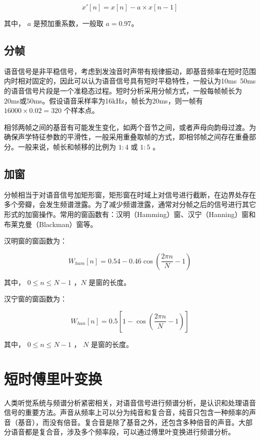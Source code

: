 \documentclass[cn,10pt,math=newtx,citestyle=gb7714-2015,bibstyle=gb7714-2015]{elegantbook}
\begin{document}
\begin{equation}
  x'[n]=x[n]-a\times x[n-1]
\end{equation}

其中， $a$ 是预加重系数，一般取 $a=0.97$。

\subsection{分帧}
语音信号是非平稳信号，考虑到发浊音时声带有规律振动，即基音频率在短时范围内时相对固定的，因此可以认为语音信号具有短时平稳特性，一般认为10ms~50ms的语音信号片段是一个准稳态过程。短时分析采用分帧方式，一般每帧帧长为20ms或50ms。假设语音采样率为16kHz，帧长为20ms，则一帧有 $16000\times 0.02=320$ 个样本点。

相邻两帧之间的基音有可能发生变化，如两个音节之间，或者声母向韵母过渡。为确保声学特征参数的平滑性，一般采用重叠取帧的方式，即相邻帧之间存在重叠部分。一般来说，帧长和帧移的比例为 $1:4$ 或 $1:5$ 。

\subsection{加窗}
分帧相当于对语音信号加矩形窗，矩形窗在时域上对信号进行截断，在边界处存在多个旁瓣，会发生频谱泄露。为了减少频谱泄露，通常对分帧之后的信号进行其它形式的加窗操作。常用的窗函数有：汉明（Hamming）窗、汉宁（Hanning）窗和布莱克曼（Blackman）窗等。

汉明窗的窗函数为：

\begin{equation}
  W_{ham}[n]=0.54-0.46\mathop{cos}(\frac{2\pi n}{N}-1)
\end{equation}

其中， $0\leq n\leq N-1$ ，$N$ 是窗的长度。

汉宁窗的窗函数为：

\begin{equation}
  W_{han}[n]=0.5[1-\mathop{cos}(\frac{2\pi n}{N}-1)]
\end{equation}

其中， $0\leq n\leq N-1$ ， $N$ 是窗的长度。

\section{短时傅里叶变换}

人类听觉系统与频谱分析紧密相关，对语音信号进行频谱分析，是认识和处理语音信号的重要方法。声音从频率上可以分为纯音和复合音，纯音只包含一种频率的声音（基音），而没有倍音。复合音是除了基音之外，还包含多种倍音的声音。大部分语音都是复合音，涉及多个频率段，可以通过傅里叶变换进行频谱分析。
\end{document}

